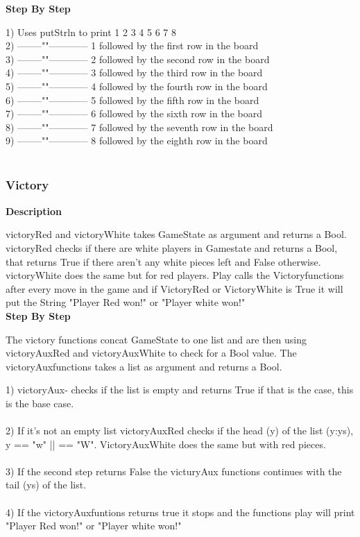 \documentclass[12pt,a4paper]{article}
\begin{document}
\textbf{Step By Step}

1) Uses putStrln to print 	1   2   3   4   5   6   7   8\\
2) --------""------------ 1 followed by the first row in the board\\
3) --------""------------ 2 followed by the second row in the board\\
4) --------""------------ 3 followed by the third row in the board\\
5) --------""------------ 4 followed by the fourth row in the board\\
6) --------""------------ 5 followed by the fifth row in the board\\
7) --------""------------ 6 followed by the sixth row in the board\\
8) --------""------------ 7 followed by the seventh row in the board\\
9) --------""------------ 8 followed by the eighth row in the board \\\\

\subsubsection{Victory}

\textbf{Description}

victoryRed and victoryWhite takes GameState as argument and returns a Bool. victoryRed checks if there are white players in Gamestate and returns a Bool, that returns True if there aren't any white pieces left and False otherwise. victoryWhite does the same but for red players. Play calls the Victoryfunctions after every move in the game and if VictoryRed or VictoryWhite is True it will put the String "Player Red won!" or "Player white won!"\\
\textbf{Step By Step}

The victory functions concat GameState to one list and are then using victoryAuxRed and victoryAuxWhite to check for a Bool value. The victoryAuxfunctions takes a list as argument and returns a Bool.

1) victoryAux- checks if the list is empty and returns True if that is the case, this is the base case. \\\\
2) If it's not an empty list victoryAuxRed checks if the head (y) of the list (y:ys), y == "w" || == "W". VictoryAuxWhite does the same but with red pieces.\\\\
3) If the second step returns False the victuryAux functions continues with the tail (ys) of the list.\\\\
4) If the victoryAuxfuntions returns true it stops and the functions play will print "Player Red won!" or "Player white won!"
\end{document}
